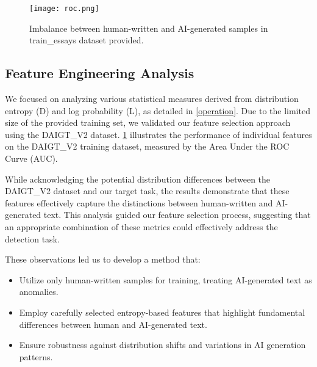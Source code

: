 \begin{figure}[t]
\begin{center}
\centerline{\texttt{[image: roc.png]}}

\caption{Imbalance between human-written and AI-generated samples in train\_essays dataset provided.}

\label{roc}
\end{center}
\vskip -0.2in
\end{figure}


\subsection{Feature Engineering Analysis}
We focused on analyzing various statistical measures derived from distribution entropy (D) and log probability (L), as detailed in \cref{operation}. Due to the limited size of the provided training set, we validated our feature selection approach using the DAIGT\_V2 dataset. \cref{roc} illustrates the performance of individual features on the DAIGT\_V2 training dataset, measured by the Area Under the ROC Curve (AUC).

While acknowledging the potential distribution differences between the DAIGT\_V2 dataset and our target task, the results demonstrate that these features effectively capture the distinctions between human-written and AI-generated text. This analysis guided our feature selection process, suggesting that an appropriate combination of these metrics could effectively address the detection task.

These observations led us to develop a method that:
\begin{itemize}
    \item Utilize only human-written samples for training, treating AI-generated text as anomalies.
    \item Employ carefully selected entropy-based features that highlight fundamental differences between human and AI-generated text.
    \item Ensure robustness against distribution shifts and variations in AI generation patterns.
\end{itemize}

